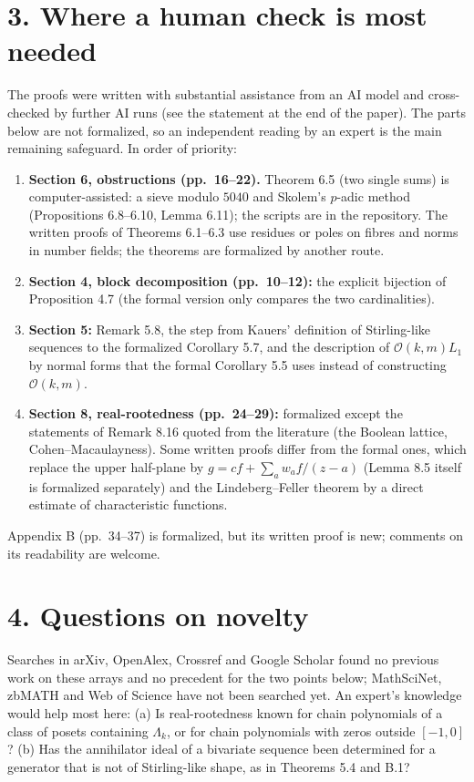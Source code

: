\documentclass[10pt]{article}
\newcommand{\cO}{\mathcal{O}}
\begin{document}
\section*{3. Where a human check is most needed}
The proofs were written with substantial assistance from an AI model and cross-checked by further AI runs (see the statement at the end of the paper). The parts below are not formalized, so an independent reading by an expert is the main remaining safeguard. In order of priority:
\begin{enumerate}
\item \textbf{Section 6, obstructions (pp.~16--22).} Theorem 6.5 (two single sums) is computer-assisted: a sieve modulo $5040$ and Skolem's $p$-adic method (Propositions 6.8--6.10, Lemma 6.11); the scripts are in the repository. The written proofs of Theorems 6.1--6.3 use residues or poles on fibres and norms in number fields; the theorems are formalized by another route.
\item \textbf{Section 4, block decomposition (pp.~10--12):} the explicit bijection of Proposition 4.7 (the formal version only compares the two cardinalities).
\item \textbf{Section 5:} Remark 5.8, the step from Kauers' definition of Stirling-like sequences to the formalized Corollary 5.7, and the description of $\cO(k,m)L_1$ by normal forms that the formal Corollary 5.5 uses instead of constructing $\cO(k,m)$.
\item \textbf{Section 8, real-rootedness (pp.~24--29):} formalized except the statements of Remark 8.16 quoted from the literature (the Boolean lattice, Cohen--Macaulayness). Some written proofs differ from the formal ones, which replace the upper half-plane by $g=cf+\sum_aw_af/(z-a)$ (Lemma 8.5 itself is formalized separately) and the Lindeberg--Feller theorem by a direct estimate of characteristic functions.
\end{enumerate}
Appendix B (pp.~34--37) is formalized, but its written proof is new; comments on its readability are welcome.

\section*{4. Questions on novelty}
Searches in arXiv, OpenAlex, Crossref and Google Scholar found no previous work on these arrays and no precedent for the two points below; MathSciNet, zbMATH and Web of Science have not been searched yet. An expert's knowledge would help most here: (a) Is real-rootedness known for chain polynomials of a class of posets containing $\Lambda_k$, or for chain polynomials with zeros outside $[-1,0]$? (b) Has the annihilator ideal of a bivariate sequence been determined for a generator that is not of Stirling-like shape, as in Theorems 5.4 and B.1?
\end{document}
